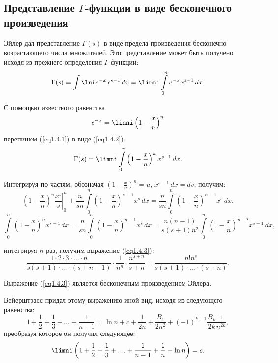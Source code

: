 \subsection{Представление \( \Gamma \)-функции в виде бесконечного произведения}

Эйлер дал представление \( \Gamma(s) \) в виде предела произведения бесконечно
возрастающего числа множителей. Это представление может быть получено исходя из
прежнего определения \( \Gamma \)-функции:
\begin{equation}
    \Gamma(s) = \int\lni e^{-x}x^{s-1}\,dx = 
    \limni\int\limits_0^n e^{-x}x^{s-1}\,dx.
    \label{eq1.4.1}
\end{equation}

С помощью известного равенства
\[
    e^{-x} = \limni\left(1-\frac{x}{n}\right)^n
\]
перепишем (\ref{eq1.4.1}) в виде (\ref{eq1.4.2}):
\begin{equation}
    \Gamma(s) = \limni\int\limits_0^n\left(1-\frac{x}{n}\right)^n
    x^{s-1}\,dx.
    \label{eq1.4.2}
\end{equation}
 
Интегрируя по частям, обозначая \( \left(1-\frac{x}{n}\right)^n = u \),
\( x^{s-1}\,dx = dv \), получим:
\[
    \left.\left(1 - \frac{x}{n}\right)^n\frac{x^s}{s}\right|_0^n +
    \frac{n}{sn}\int\limits_0^n \left(1 - \frac{x}{n}\right)^{n-1}x^s\,dx =
    \frac{n}{sn}\int\limits_0^n \left(1-\frac{x}{n}\right)^{n-1} x^s\,dx.
\]
 \[
    \int\limits_0^n \left(1 - \frac{x}{n}\right)^nx^{s-1}\,dx =
    \frac{n}{sn}\int\limits_0^n \left(1 - \frac{x}{n}\right)^{n-1}x^s\,dx =
    \frac{n(n-1)}{s(s+1)n^2} \int\limits_0^n \left(1 - \frac{x}{n}\right)^{n-2}
    x^{s+1}\,dx,
\]
 
интегрируя \( n \) раз, получим выражение (\ref{eq1.4.3}):
 \begin{equation}
    \frac{1\cdot2\cdot3\cdot\ldots\cdot n}{s(s+1)\cdot\ldots\cdot(s+n-1)}
    \cdot\frac{1}{n^n}\cdot\frac{n^{s+n}}{s+n} =
    \frac{n!n^s}{s(s+1)\cdot\ldots\cdot(s+n)}.
    \label{eq1.4.3}
\end{equation}

Выражение (\ref{eq1.4.3}) является бесконечным произведением Эйлера.

Вейерштрасс придал этому выражению иной вид, исходя из следующего равенства:
\[
    1 + \frac{1}{2} + \frac{1}{3} + \ldots + \frac{1}{n-1} = \ln{n} + c +
    \frac{1}{2n} + \frac{B_1}{2n^2} + (-1)^{k-1}\frac{B_k}{2k}\frac{1}{n^{2k}},
\]
преобразуя которое он получил следующее:
\[
    \limni\left(1+\frac{1}{2}+\frac{1}{3}+\ldots+ \frac{1}{n-1} + \frac{1}{n} -
    \ln{n}\right) = c.
\]

